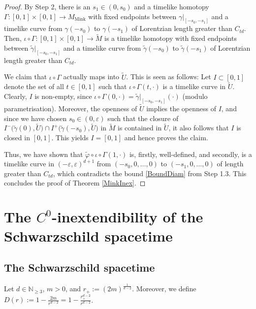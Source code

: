 \documentclass[reqno]{article}
\newcommand{\N}{\mathbb{N}}
\newcommand{\ed}{(-\varepsilon, \varepsilon)^{d+1}}
\newcommand{\Mmink}{M_{\mathrm{Mink}}}
\begin{document}
\begin{proof}
By Step 2, there is an $s_1 \in (0,s_0)$ and a timelike homotopy $\Gamma : [0,1] \times [0,1] \to \Mmink$ with fixed endpoints between $\gamma|_{[-s_0,-s_1]}$ and a timelike curve from $\gamma(-s_0)$ to $\gamma(-s_1)$ of Lorentzian length greater than $C_{td}$. Then, $\iota \circ \Gamma  : [0,1] \times [0,1] \to \tilde{M}$ is a timelike homotopy with fixed endpoints between $\tilde{\gamma}|_{[-s_0,-s_1]}$ and a timelike curve from $\tilde{\gamma}(-s_0)$ to $\tilde{\gamma}(-s_1)$ of Lorentzian length greater than $C_{td}$. 

We claim that $\iota \circ \Gamma$ actually maps into $\tilde{U}$. This is seen as follows: Let $I \subset [0,1]$ denote the set of all $t \in [0,1]$ such that $\iota \circ \Gamma (t, \cdot)$ is a timelike curve in $\tilde{U}$. Clearly, $I$ is non-empty, since $\iota \circ \Gamma (0, \cdot) = \tilde{\gamma}|_{[-s_0, -s_1]}(\cdot)$ (modulo parametrisation). Moreover, the openness of $\tilde{U}$ implies the openness of $I$, and since we have chosen $s_0 \in (0, \varepsilon)$ such that the closure of $I^-\big(\tilde{\gamma}(0), \tilde{U}\big) \cap I^+\big(\tilde{\gamma}(-s_0), \tilde{U}\big)$ in $\tilde{M}$ is contained in $\tilde{U}$, it also follows that $I$ is closed in $[0,1]$. This yields $I = [0,1]$ and hence proves the claim.

Thus, we have shown that $\tilde{\varphi} \circ \iota \circ \Gamma (1, \cdot)$ is, firstly, well-defined, and secondly, is a timelike curve in $\ed$ from $(-s_0, 0, \ldots, 0)$ to $(-s_1, 0, \ldots, 0)$ of length greater than $C_{td}$, which contradicts the bound \eqref{BoundDiam} from Step 1.3. This concludes the proof of Theorem \ref{MinkInex}.
\end{proof}







\section{The $C^0$-inextendibility of the Schwarzschild spacetime}
\label{SecSchw}




\subsection{The Schwarzschild spacetime}


Let $d \in \N_{\geq 3}$, $m>0$, and $r_+ := (2m)^{\frac{1}{d-2}}$. Moreover, we define $D(r) := 1 - \frac{2m}{r^{d-2}} = 1 - \frac{r_+^{d-2}}{r^{d-2}}$.
\end{document}
